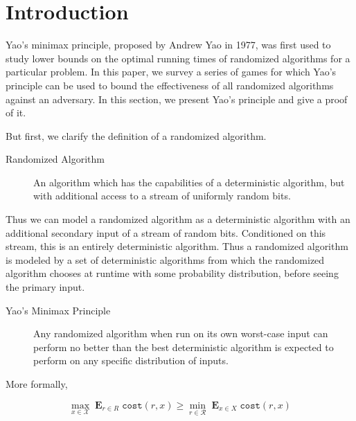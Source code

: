 \newcommand{\Expected}{\mathop{\mathbf{E}}}
\newcommand{\argmin}{\mathop{\text{arg\,min}}}

\section{Introduction}

Yao's minimax principle, proposed by Andrew Yao in 1977, was first used to study lower bounds on the optimal running times of randomized algorithms for a particular problem. In this paper, we survey a series of games for which Yao's principle can be used to bound the effectiveness of all randomized algorithms against an adversary.
In this section, we present Yao's principle and give a proof of it.

But first, we clarify the definition of a randomized algorithm.

\begin{description}
	\item[Randomized Algorithm] An algorithm which has the capabilities of a deterministic algorithm, but with additional access to a stream of uniformly random bits.
\end{description}

Thus we can model a randomized algorithm as a deterministic algorithm with an additional secondary input of a stream of random bits. Conditioned on this stream, this is an entirely deterministic algorithm. Thus a randomized algorithm is modeled by a set of deterministic algorithms from which the randomized algorithm chooses at runtime with some probability distribution, before seeing the primary input.


\begin{description}
	\item[Yao's Minimax Principle] Any randomized algorithm when run on its own worst-case input can perform no better than the best deterministic algorithm is expected to perform on any specific distribution of inputs.
\end{description}
More formally,

$$\max_{x \in \mathcal{X}} \Expected_{r \in R} \texttt{cost}(r, x) \geq \min_{r \in \mathcal{R}} \Expected_{x \in X} \texttt{cost}(r, x)$$

